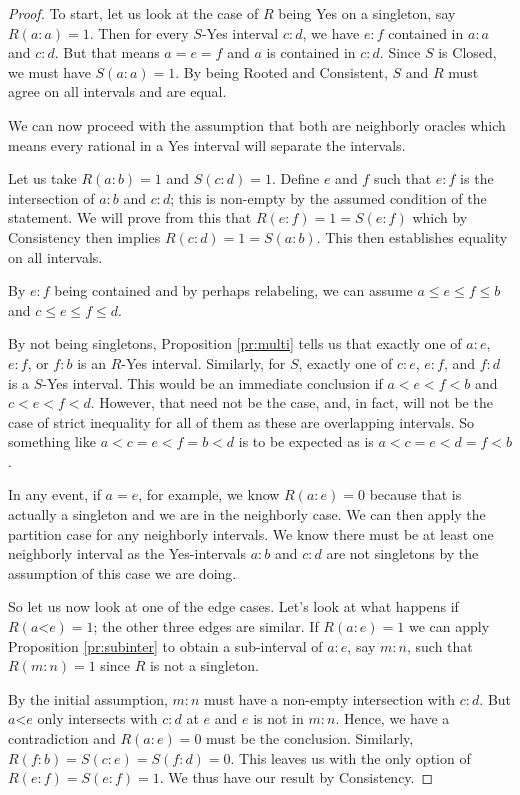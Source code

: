 \documentclass[12pt]{article}
\theoremstyle{remark}
\newcommand{\lt}{\mathord{<}}
\begin{document}
\begin{proof}
To start, let us look at the case of $R$ being Yes on a singleton, say $R(a:a) = 1$. Then for every $S$-Yes interval $c:d$, we have $e:f$ contained in $a:a$ and $c:d$. But that means $a=e=f$ and $a$ is contained in $c:d$. Since $S$ is Closed, we must have $S(a:a)=1$. By being Rooted and Consistent, $S$ and $R$ must agree on all intervals and are equal. 

We can now proceed with the assumption that both are neighborly oracles which means every rational in a Yes interval will separate the intervals. 

Let us take $R(a:b) = 1$ and $S(c:d) = 1$. Define $e$ and $f$ such that $e:f$ is the intersection of $a:b$ and $c:d$; this is non-empty by the assumed condition of the statement. We will prove from this that $R(e:f)=1 = S(e:f)$ which by Consistency then implies $R(c:d) = 1 = S(a:b)$. This then establishes equality on all intervals. 

By $e:f$ being contained and by perhaps relabeling, we can assume $a \leq e \leq f \leq b$ and $c \leq e \leq f \leq d$. 

By not being singletons, Proposition \ref{pr:multi} tells us that exactly one of $a:e$, $e:f$, or $f:b$ is an $R$-Yes interval. Similarly, for $S$, exactly one of $c:e$, $e:f$, and $f:d$ is a $S$-Yes interval. This would be an immediate conclusion if $a < e < f < b$ and $c < e < f < d$. However, that need not be the case, and, in fact, will not be the case of strict inequality for all of them as these are overlapping intervals. So something like $a < c = e < f = b < d$ is to be expected as is $a < c = e < d = f < b$. 

In any event, if $a=e$, for example, we know $R(a:e) = 0$ because that is actually a singleton and we are in the neighborly case. We can then apply the partition case for any neighborly intervals. We know there must be at least one neighborly interval as the Yes-intervals $a:b$ and $c:d$ are not singletons by the assumption of this case we are doing. 

So let us now look at one of the edge cases. Let's look at what happens if $R(a\lt e) = 1$; the other three edges are similar. If $R(a:e) =1$ we can apply Proposition \ref{pr:subinter} to obtain a sub-interval of $a:e$, say $m:n$, such that $R(m:n) = 1$ since $R$ is not a singleton. 

By the initial assumption, $m:n$ must have a non-empty intersection with $c:d$. But $a\lt e$ only intersects with $c:d$ at $e$ and $e$ is not in $m:n$. Hence, we have a contradiction and $R(a:e)=0$ must be the conclusion. Similarly, $R(f:b) = S(c:e) = S(f:d) = 0$. This leaves us with the only option of $R(e:f) = S(e:f) = 1$. We thus have our result by Consistency.  

\end{proof}
\end{document}
